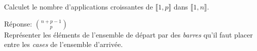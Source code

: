 \begin{exercice}
    Calculet le nombre d'applications croissantes de $\llbracket 1, p \rrbracket$ dans $\llbracket 1, n \rrbracket$.
\end{exercice}

\begin{elem_sol}
    Réponse: $\displaystyle \binom{n + p - 1}{p}$ \\
    Représenter les éléments de l'ensemble de départ par des \emph{barres} qu'il faut placer entre les \emph{cases} de l'ensemble d'arrivée. 
\end{elem_sol}